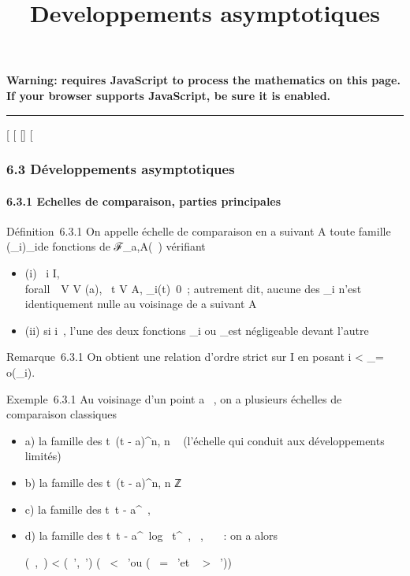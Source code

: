 \documentclass[]{article}
\title{Developpements asymptotiques}
\author{}
\date{}
\begin{document}
\maketitle

\textbf{Warning: 
requires JavaScript to process the mathematics on this page.\\ If your
browser supports JavaScript, be sure it is enabled.}

\begin{center}\rule{3in}{0.4pt}\end{center}

{[}
{[}
{[}{]}
{[}

\subsubsection{6.3 Développements asymptotiques}

\paragraph{6.3.1 Echelles de comparaison, parties principales}

Définition~6.3.1 On appelle échelle de comparaison en a suivant A toute
famille (\phi\_i)\_i\inI de fonctions de ℱ\_a,A(~)
vérifiant

\begin{itemize}
\itemsep1pt\parskip0pt
\item
  (i) \forall~i \in I, \\forall~~V \in V
  (a), \exists~t \in V \bigcap A,
  \phi\_i(t)\neq~0~; autrement dit, aucune
  des \phi\_i n'est identiquement nulle au voisinage de a suivant A
\item
  (ii) si i\neq~\jmath, l'une des deux fonctions
  \phi\_i ou \phi\_\jmath est négligeable devant l'autre
\end{itemize}

Remarque~6.3.1 On obtient une relation d'ordre strict sur I en posant i
\textless{} \jmath \Leftrightarrow \phi\_\jmath =
o(\phi\_i).

Exemple~6.3.1 Au voisinage d'un point a \in {}~, on a plusieurs échelles de
comparaison classiques

\begin{itemize}
\item
  a) la famille des t\mapsto~(t - a)^n, n
  \in {}~ (l'échelle qui conduit aux développements limités)
\item
  b) la famille des t\mapsto~(t - a)^n, n
  \in ℤ
\item
  c) la famille des t\mapsto~\textbar{}t -
  a\textbar{}^\alpha~, \alpha~ \in {}~
\item
  d) la famille des t\mapsto~\textbar{}t -
  a\textbar{}^\alpha~\textbar{}log~
  t\textbar{}^\beta~, \alpha~,\beta~ \in {}~~: on a alors

  (\alpha~,\beta~) \textless{} (\alpha~',\beta~') \Leftrightarrow
  \bigl (\alpha~ \textless{} \alpha~'\text ou (\alpha~
  = \alpha~'\text et \beta~ \textgreater{}
  \beta~')\bigr )
\end{itemize}
\end{document}
